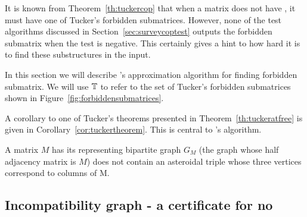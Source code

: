 It is known from Theorem~\ref{th:tuckercop}
that when a matrix does not have \COP, it must have one of Tucker's
forbidden submatrices. However, none of the \COP test algorithms discussed in
Section~\ref{sec:surveycoptest} outputs the forbidden submatrix when
the test is negative. This certainly gives a hint to how hard it is to find
these substructures in the input. 

In this section we will describe \cite{d08phd}'s approximation
algorithm for finding forbidden submatrix. We will use $\mathbb{T}$ to
refer to the set of Tucker's forbidden submatrices shown in
Figure~\ref{fig:forbiddensubmatrices}.


A corollary to one of Tucker's theorems presented in
Theorem~\ref{th:tuckeratfree} is given in
Corollary~\ref{cor:tuckertheorem}. This is central to \cite{d08phd}'s
algorithm.

\begin{corollary}
  \label{cor:tuckertheorem}
  A matrix $M$ has \COP \iff its representing bipartite graph $G_M$
  (the graph whose half adjacency matrix is $M$) does not contain an
  asteroidal triple whose three vertices correspond to columns of M.
\end{corollary}






\subsection{Incompatibility graph - a certificate for no \COP}

